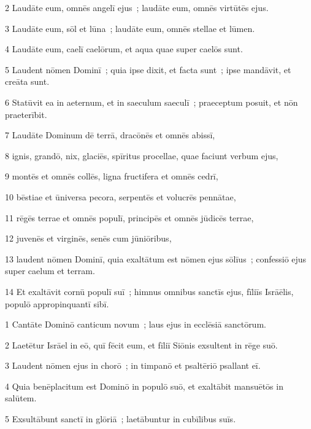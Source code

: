\psalmVerse
  {\phantom{00}2}
  {Laudāte eum, omnēs angelī ejus~; laudāte eum, omnēs virtūtēs ejus.}


\psalmVerse
  {\phantom{00}3}
  {Laudāte eum, sōl et lūna~; laudāte eum, omnēs stellae et lūmen.}


\psalmVerse
  {\phantom{00}4}
  {Laudāte eum, caelī caelōrum, et aqua quae super caelōs sunt.}


\psalmVerse
  {\phantom{00}5}
  {Laudent nōmen Dominī~; quia ipse dixit, et facta sunt~; ipse mandāvit, et creāta sunt.}


\psalmVerse
  {\phantom{00}6}
  {Statūvit ea in aeternum, et in saeculum saeculī~; praeceptum posuit, et nōn praeterībit.}


\psalmVerse
  {\phantom{00}7}
  {Laudāte Dominum dē terrā, dracōnēs et omnēs abissī,}


\psalmVerse
  {\phantom{00}8}
  {ignis, grandō, nix, glaciēs, spīritus procellae, quae faciunt verbum ejus,}


\psalmVerse
  {\phantom{00}9}
  {montēs et omnēs collēs, ligna fructifera et omnēs cedrī,}


\psalmVerse
  {\phantom{0}10}
  {bēstiae et ūniversa pecora, serpentēs et volucrēs pennātae,}


\psalmVerse
  {\phantom{0}11}
  {rēgēs terrae et omnēs populī, principēs et omnēs jūdicēs terrae,}


\psalmVerse
  {\phantom{0}12}
  {juvenēs et virginēs, senēs cum jūniōribus,}


\psalmVerse
  {\phantom{0}13}
  {laudent nōmen Dominī, quia exaltātum est nōmen ejus sōlīus~; confessiō ejus super caelum et terram.}


\psalmVerse
  {\phantom{0}14}
  {Et exaltāvit cornū populī suī~; himnus omnibus sanctīs ejus, fīliīs Isrāēlis, populō appropinquantī sibī.}



\psalmVerse
  {\phantom{00}1}
  {Cantāte Dominō canticum novum~; laus ejus in ecclēsiā sanctōrum.}


\psalmVerse
  {\phantom{00}2}
  {Laetētur Isrāel in eō, quī fēcit eum, et fīliī Siōnis exsultent in rēge suō.}


\psalmVerse
  {\phantom{00}3}
  {Laudent nōmen ejus in chorō~; in timpanō et psaltēriō psallant eī.}


\psalmVerse
  {\phantom{00}4}
  {Quia benēplacitum est Dominō in populō suō, et exaltābit mansuētōs in salūtem.}


\psalmVerse
  {\phantom{00}5}
  {Exsultābunt sanctī in glōriā~; laetābuntur in cubīlibus suīs.}


